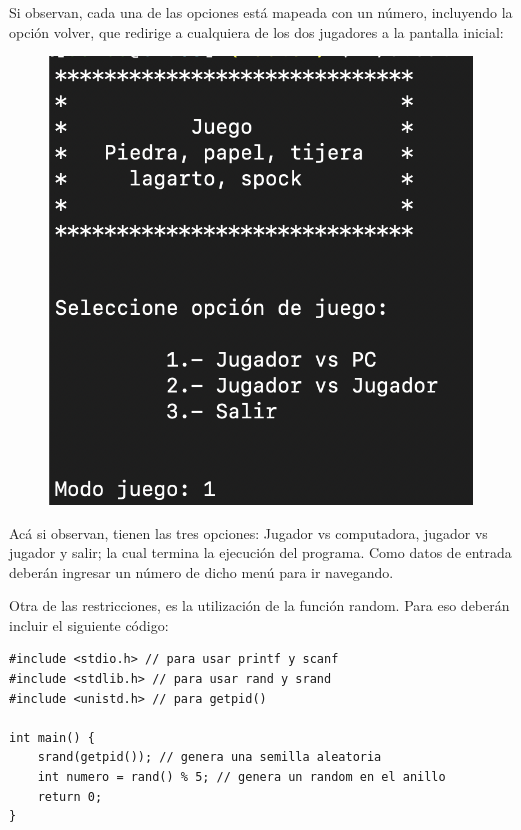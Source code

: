 \documentclass[]{article}
\begin{document}
    Si observan, cada una de las opciones está mapeada con un número, incluyendo la opción volver, que redirige a cualquiera de los dos jugadores a la pantalla inicial:

    \begin{figure}[H]
        \includegraphics[scale=0.5]{ejPantallaInicial}
        \label{img.2}
    \end{figure}

    Acá si observan, tienen las tres opciones: Jugador vs computadora, jugador vs jugador y salir; la cual termina la ejecución del programa. Como datos de entrada deberán ingresar un número de dicho menú para ir navegando.

    Otra de las restricciones, es la utilización de la función random. Para eso deberán incluir el siguiente código:\\

    \begin{listing}[H]
        \begin{verbatim}
#include <stdio.h> // para usar printf y scanf
#include <stdlib.h> // para usar rand y srand
#include <unistd.h> // para getpid()

int main() {
    srand(getpid()); // genera una semilla aleatoria
    int numero = rand() % 5; // genera un random en el anillo
    return 0;
}
        \end{verbatim}
        \label{code.1}
    \end{listing}
\end{document}
